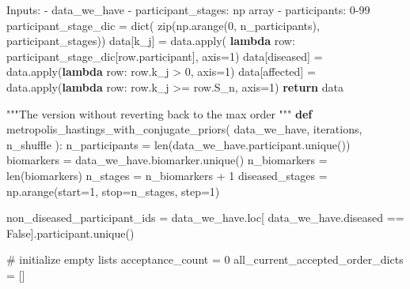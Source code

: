 \documentclass[
  letterpaper,
  DIV=11,
  numbers=noendperiod]{scrreprt}
\newenvironment{Shaded}{\begin{snugshade}}{\end{snugshade}}
\newcommand{\BuiltInTok}[1]{\textcolor[rgb]{0.00,0.23,0.31}{#1}}
\newcommand{\CommentTok}[1]{\textcolor[rgb]{0.37,0.37,0.37}{#1}}
\newcommand{\ControlFlowTok}[1]{\textcolor[rgb]{0.00,0.23,0.31}{\textbf{#1}}}
\newcommand{\DecValTok}[1]{\textcolor[rgb]{0.68,0.00,0.00}{#1}}
\newcommand{\KeywordTok}[1]{\textcolor[rgb]{0.00,0.23,0.31}{\textbf{#1}}}
\newcommand{\NormalTok}[1]{\textcolor[rgb]{0.00,0.23,0.31}{#1}}
\newcommand{\OperatorTok}[1]{\textcolor[rgb]{0.37,0.37,0.37}{#1}}
\newcommand{\StringTok}[1]{\textcolor[rgb]{0.13,0.47,0.30}{#1}}
\newcommand{\VariableTok}[1]{\textcolor[rgb]{0.07,0.07,0.07}{#1}}
\begin{document}
\begin{Shaded}
\begin{Highlighting}[]
\CommentTok{    Inputs:}
\CommentTok{        {-} data\_we\_have}
\CommentTok{        {-} participant\_stages: np array }
\CommentTok{        {-} participants: 0{-}99}
\CommentTok{    \textquotesingle{}\textquotesingle{}\textquotesingle{}}
\NormalTok{    participant\_stage\_dic }\OperatorTok{=} \BuiltInTok{dict}\NormalTok{(}
        \BuiltInTok{zip}\NormalTok{(np.arange(}\DecValTok{0}\NormalTok{, n\_participants), participant\_stages))}
\NormalTok{    data[}\StringTok{\textquotesingle{}k\_j\textquotesingle{}}\NormalTok{] }\OperatorTok{=}\NormalTok{ data.}\BuiltInTok{apply}\NormalTok{(}
        \KeywordTok{lambda}\NormalTok{ row: participant\_stage\_dic[row.participant], axis}\OperatorTok{=}\DecValTok{1}\NormalTok{)}
\NormalTok{    data[}\StringTok{\textquotesingle{}diseased\textquotesingle{}}\NormalTok{] }\OperatorTok{=}\NormalTok{ data.}\BuiltInTok{apply}\NormalTok{(}\KeywordTok{lambda}\NormalTok{ row: row.k\_j }\OperatorTok{\textgreater{}} \DecValTok{0}\NormalTok{, axis}\OperatorTok{=}\DecValTok{1}\NormalTok{)}
\NormalTok{    data[}\StringTok{\textquotesingle{}affected\textquotesingle{}}\NormalTok{] }\OperatorTok{=}\NormalTok{ data.}\BuiltInTok{apply}\NormalTok{(}\KeywordTok{lambda}\NormalTok{ row: row.k\_j }\OperatorTok{\textgreater{}=}\NormalTok{ row.S\_n, axis}\OperatorTok{=}\DecValTok{1}\NormalTok{)}
    \ControlFlowTok{return}\NormalTok{ data}

\CommentTok{"""The version without reverting back to the max order}
\CommentTok{"""}
\KeywordTok{def}\NormalTok{ metropolis\_hastings\_with\_conjugate\_priors(}
\NormalTok{    data\_we\_have,}
\NormalTok{    iterations,}
\NormalTok{    n\_shuffle}
\NormalTok{):}
\NormalTok{    n\_participants }\OperatorTok{=} \BuiltInTok{len}\NormalTok{(data\_we\_have.participant.unique())}
\NormalTok{    biomarkers }\OperatorTok{=}\NormalTok{ data\_we\_have.biomarker.unique()}
\NormalTok{    n\_biomarkers }\OperatorTok{=} \BuiltInTok{len}\NormalTok{(biomarkers)}
\NormalTok{    n\_stages }\OperatorTok{=}\NormalTok{ n\_biomarkers }\OperatorTok{+} \DecValTok{1}
\NormalTok{    diseased\_stages }\OperatorTok{=}\NormalTok{ np.arange(start}\OperatorTok{=}\DecValTok{1}\NormalTok{, stop}\OperatorTok{=}\NormalTok{n\_stages, step}\OperatorTok{=}\DecValTok{1}\NormalTok{)}

\NormalTok{    non\_diseased\_participant\_ids }\OperatorTok{=}\NormalTok{ data\_we\_have.loc[}
\NormalTok{        data\_we\_have.diseased }\OperatorTok{==} \VariableTok{False}\NormalTok{].participant.unique()}

    \CommentTok{\# initialize empty lists}
\NormalTok{    acceptance\_count }\OperatorTok{=} \DecValTok{0}
\NormalTok{    all\_current\_accepted\_order\_dicts }\OperatorTok{=}\NormalTok{ []}


\end{Highlighting}
\end{Shaded}
\end{document}
